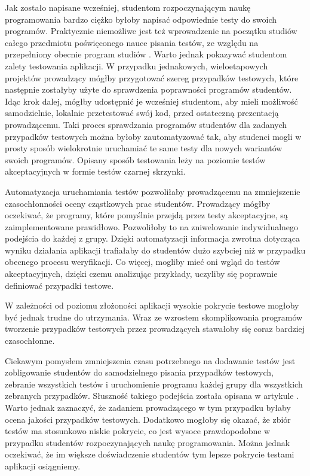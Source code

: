 Jak zostało napisane wcześniej, studentom rozpoczynającym naukę programowania bardzo ciężko byłoby napisać odpowiednie testy do swoich programów.
Praktycznie niemożliwe jest też wprowadzenie na początku studiów całego przedmiotu poświęconego nauce pisania testów, ze względu na przepełniony obecnie program studiów \cite{overflow-studies-program}.
Warto jednak pokazywać studentom zalety testowania aplikacji.
W przypadku jednakowych, wieloetapowych projektów prowadzący mógłby przygotować szereg przypadków testowych, które następnie zostałyby użyte do sprawdzenia poprawności programów studentów.
Idąc krok dalej, mógłby udostępnić je wcześniej studentom, aby mieli możliwość samodzielnie, lokalnie przetestować swój kod, przed ostateczną prezentacją prowadzącemu.
Taki proces sprawdzania programów studentów dla zadanych przypadków testowych można byłoby zautomatyzować tak, aby studenci mogli w prosty sposób wielokrotnie uruchamiać te same testy dla nowych wariantów swoich programów.
Opisany sposób testowania leży na poziomie testów akceptacyjnych w formie testów czarnej skrzynki.

Automatyzacja uruchamiania testów pozwoliłaby prowadzącemu na zmniejszenie czasochłonności oceny cząstkowych prac studentów.
Prowadzący mógłby oczekiwać, że programy, które pomyślnie przejdą przez testy akceptacyjne, są zaimplementowane prawidłowo.
Pozwoliłoby to na zniwelowanie indywidualnego podejścia do każdej z grupy.
Dzięki automatyzacji informacja zwrotna dotycząca wyniku działania aplikacji trafiałaby do studentów dużo szybciej niż w przypadku obecnego procesu weryfikacji.
Co więcej, mogliby mieć oni wgląd do testów akceptacyjnych, dzięki czemu analizując przykłady, uczyliby się poprawnie definiować przypadki testowe.

W zależności od poziomu złożoności aplikacji wysokie pokrycie testowe mogłoby być jednak trudne do utrzymania.
Wraz ze wzrostem skomplikowania programów tworzenie przypadków testowych przez prowadzących stawałoby się coraz bardziej czasochłonne.

Ciekawym pomysłem zmniejszenia czasu potrzebnego na dodawanie testów jest zobligowanie studentów do samodzielnego pisania przypadków testowych, zebranie wszystkich testów i uruchomienie programu każdej grupy dla wszystkich zebranych przypadków. 
Słuszność takiego podejścia została opisana w artykule \cite{write-tests-by-students}.
Warto jednak zaznaczyć, że zadaniem prowadzącego w tym przypadku byłaby ocena jakości przypadków testowych.
Dodatkowo mogłoby się okazać, że zbiór testów ma stosunkowo niskie pokrycie, co jest wysoce prawdopodobne w przypadku studentów rozpoczynających naukę programowania.
Można jednak oczekiwać, że im większe doświadczenie studentów tym lepsze pokrycie testami aplikacji osiągniemy.

